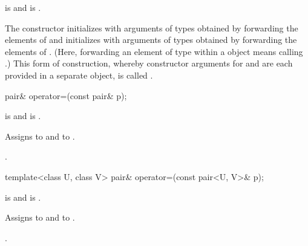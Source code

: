 \begin{itemdescr}
\pnum
\requires {} is 
and  is .

\pnum
\effects The constructor initializes  with arguments of types
 obtained by forwarding the elements of 
and initializes  with arguments of types 
obtained by forwarding the elements of . (Here, forwarding
an element  of type  within a  object means calling
.) This form of construction, whereby constructor
arguments for  and  are each provided in a separate
 object, is called .
\end{itemdescr}

\begin{itemdecl}
pair& operator=(const pair& p);
\end{itemdecl}

\begin{itemdescr}
\pnum
\requires {} is 
and  is .

\pnum
\effects Assigns  to  and  to .

\pnum
\returns {}.
\end{itemdescr}

\begin{itemdecl}
template<class U, class V> pair& operator=(const pair<U, V>& p);
\end{itemdecl}

\begin{itemdescr}
\pnum
\requires {} is 
and  is .

\pnum
\effects Assigns  to  and  to .

\pnum
\returns {}.
\end{itemdescr}

